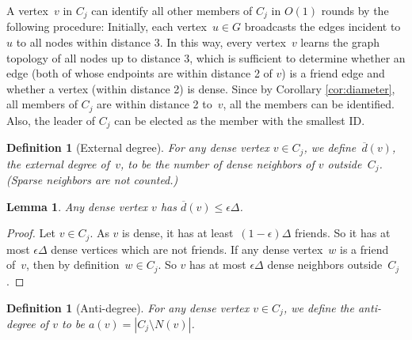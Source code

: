 \documentclass[11pt]{amsart}
\newtheorem{lemma}[theorem]{Lemma}
\newtheorem{definition}[theorem]{Definition}
\newcommand{\extd}{\ensuremath{{\overline{d}}}}
\begin{document}
A vertex~$v$ in $C_j$ can identify all other members of $C_j$ in $O(1)$ rounds by  the following procedure: Initially, each vertex~$u \in G$ broadcasts the edges incident to $u$ to all nodes within distance 3.  In this way, every vertex~$v$ learns the graph topology of all nodes up to distance 3, which is sufficient to determine whether an edge (both of whose endpoints are within distance 2 of $v$) is a friend edge and whether a vertex (within distance 2) is dense. Since by Corollary \ref{cor:diameter}, all members of $C_j$ are within distance 2 to~$v$, all the members can be identified. Also, the leader of $C_j$ can be elected as the member with the smallest ID.


\begin{definition}[External degree]
For any dense vertex $v \in C_j$, we define~$\extd(v)$, the \emph{external degree} of~$v$, to be the number of \emph{dense} neighbors of $v$ outside~$C_j$. (Sparse neighbors are not counted.)
\end{definition}

\begin{lemma}
\label{network1}
Any dense vertex $v$ has $\extd(v) \leq \epsilon \Delta$.
\end{lemma}
\begin{proof}
Let $v \in C_j$. As $v$ is dense, it has at least~$(1 - \epsilon) \Delta$ friends. So it has at most $\epsilon \Delta$ dense vertices which are not friends.  If any dense vertex~$w$ is a friend of~$v$, then by definition~$w \in C_j$. So $v$ has at most $\epsilon \Delta$ dense neighbors outside~$C_j$.
\end{proof}

\begin{definition}[Anti-degree]
For any dense vertex $v \in C_j$, we define the \emph{anti-degree} of $v$ to be $a(v) = |C_j \setminus N(v)|$.
\end{definition}
\end{document}
